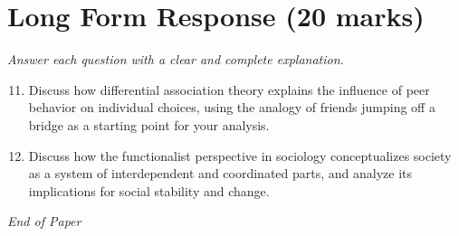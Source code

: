 \documentclass[12pt]{article}
\begin{document}
\section*{Long Form Response (20 marks)}
\textit{Answer each question with a clear and complete explanation.}
\begin{enumerate}[label=\arabic*.]
\setcounter{enumi}{10}
\item Discuss how differential association theory explains the influence of peer behavior on individual choices, using the analogy of friends jumping off a bridge as a starting point for your analysis.
\item Discuss how the functionalist perspective in sociology conceptualizes society as a system of interdependent and coordinated parts, and analyze its implications for social stability and change.
\end{enumerate}

\vfill
\noindent\textit{End of Paper}
\end{document}
